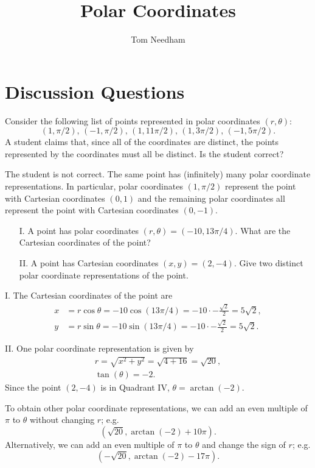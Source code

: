 \documentclass[noauthor,handout]{ximera}
\author{Tom Needham}
\title[Collaborate:]{Polar Coordinates}
\begin{document}
\begin{abstract}
\end{abstract}
\maketitle

\section{Discussion Questions}

\begin{problem}
Consider the following list of points represented in polar coordinates $(r,\theta)$:
$$
(1,\pi/2), \, (-1,\pi/2),\,  (1,11\pi/2), \, (1,3\pi/2), \, (-1,5\pi/2).
$$
A student claims that, since all of the coordinates are distinct, the points represented by the coordinates must all be distinct. Is the student correct?
\begin{freeResponse}
The student is not correct. The same point has (infinitely) many polar coordinate representations. In particular, polar coordinates $(1,\pi/2)$ represent the point with Cartesian coordinates $(0,1)$ and the remaining polar coordinates all represent the point with Cartesian coordinates $(0,-1)$.
\end{freeResponse}
\end{problem}

\begin{problem}
\begin{itemize}
\item[I.] A point has polar coordinates $(r,\theta)=(-10,13\pi/4)$. What are the Cartesian coordinates of the point?

\item[II.] A point has Cartesian coordinates $(x,y)=(2,-4)$. Give two distinct polar coordinate representations of the point.
\end{itemize}

\begin{freeResponse}
I. The Cartesian coordinates of the point are 
\begin{align*}
x&= r \cos \theta = -10 \cos (13\pi/4) = -10 \cdot -\frac{\sqrt{2}}{2} = 5 \sqrt{2}, \\
y &= r \sin \theta = -10 \sin (13 \pi/ 4) = -10 \cdot -\frac{\sqrt{2}}{2} = 5 \sqrt{2}.
\end{align*}

II. One polar coordinate representation is given by
\begin{align*}
r = \sqrt{x^2 + y^2} = \sqrt{4 + 16} = \sqrt{20}, \\
\tan(\theta) = -2.
\end{align*}
Since the point $(2,-4)$ is in Quadrant IV, $\theta = \arctan(-2)$.

To obtain other polar coordinate representations, we can add an even multiple of $\pi$ to $\theta$ without changing $r$; e.g.
$$
\left(\sqrt{20},\arctan(-2) + 10 \pi \right).
$$
Alternatively, we can add an even multiple of $\pi$ to $\theta$ and change the sign of $r$; e.g.
$$
\left(-\sqrt{20},\arctan(-2)-17 \pi\right).
$$
\end{freeResponse}
\end{problem}
\end{document}
